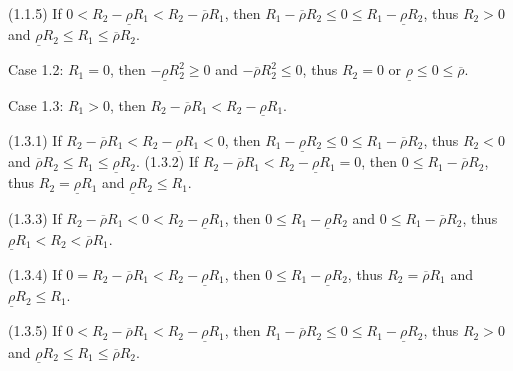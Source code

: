 \documentclass[10pt]{article}
\begin{document}
(1.1.5) If $ 0 < R_2 - \underline{\rho} R_1 < R_2 - \overline{\rho} R_1 $, then $ R_1 - \overline{\rho} R_2 \leqslant 0 \leqslant R_1 - \underline{\rho} R_2 $, thus $ R_2 > 0 $ and $ \underline{\rho} R_2 \leqslant R_1 \leqslant \overline{\rho} R_2 $. 

Case 1.2: $ R_1 = 0 $, then $ - \underline{\rho} R_2^2 \geqslant 0 $ and $ - \overline{\rho} R_2^2 \leqslant 0 $, thus $ R_2 = 0 $ or $ \underline{\rho} \leqslant 0 \leqslant \overline{\rho} $.

Case 1.3: $ R_1 > 0 $, then $ R_2 - \overline{\rho} R_1 < R_2 - \underline{\rho} R_1 $.

(1.3.1) If $ R_2 - \overline{\rho} R_1 < R_2 - \underline{\rho} R_1 < 0 $, then $ R_1 - \underline{\rho} R_2 \leqslant 0 \leqslant R_1 - \overline{\rho} R_2 $, thus $ R_2 < 0 $ and $ \overline{\rho} R_2 \leqslant R_1 \leqslant \underline{\rho} R_2 $. 
(1.3.2) If $ R_2 - \overline{\rho} R_1 < R_2 - \underline{\rho} R_1 = 0 $, then $ 0 \leqslant R_1 - \overline{\rho} R_2 $, thus $ R_2 = \underline{\rho} R_1 $ and $ \underline{\rho} R_2 \leqslant R_1 $.

(1.3.3) If $ R_2 - \overline{\rho} R_1 < 0 < R_2 - \underline{\rho} R_1 $, then $ 0 \leqslant R_1 - \underline{\rho} R_2 $ and $ 0 \leqslant R_1 - \overline{\rho} R_2 $, thus $ \underline{\rho} R_1 < R_2 < \overline{\rho} R_1 $.

(1.3.4) If $ 0 = R_2 - \overline{\rho} R_1 < R_2 - \underline{\rho} R_1 $, then $ 0 \leqslant R_1 - \underline{\rho} R_2 $, thus $ R_2 = \overline{\rho} R_1 $ and $ \underline{\rho} R_2 \leqslant R_1 $.

(1.3.5) If $ 0 < R_2 - \overline{\rho} R_1 < R_2 - \underline{\rho} R_1 $, then $ R_1 - \overline{\rho} R_2 \leqslant 0 \leqslant R_1 - \underline{\rho} R_2 $, thus $ R_2 > 0 $ and $ \underline{\rho} R_2 \leqslant R_1 \leqslant \overline{\rho} R_2 $. 
\end{document}
